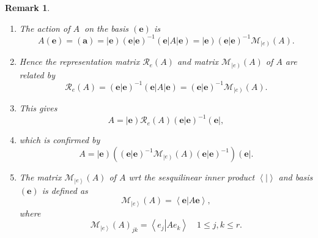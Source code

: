 \documentclass[aps,preprint]{revtex4}%
\newtheorem{remark}[theorem]{Remark}
\begin{document}
\begin{remark}
\begin{enumerate}
\item The action of $A\ $ on the basis $\left(  \mathbf{e}\right)  $ is
\begin{equation}
A\left(  \mathbf{e}\right)  =\left(  \mathbf{a}\right)  =\left\vert
\mathbf{e}\right)  \left(  \left.  \mathbf{e}\right\vert \mathbf{e}\right)
^{-1}\left(  \mathbf{e}\right\vert A\left\vert \mathbf{e}\right)  =\left\vert
\mathbf{e}\right)  \left(  \left.  \mathbf{e}\right\vert \mathbf{e}\right)
^{-1}\mathcal{M}_{\left\vert e\right)  }\left(  A\right)  .
\end{equation}


\item Hence the representation matrix $\mathcal{R}_{e}\left(  A\right)  $ and
matrix $\mathcal{M}_{\left\vert e\right)  }\left(  A\right)  $ of $A$ are
related by
\begin{equation}
\mathcal{R}_{e}\left(  A\right)  =\left(  \left.  \mathbf{e}\right\vert
\mathbf{e}\right)  ^{-1}\left(  \mathbf{e}\right\vert A\left\vert
\mathbf{e}\right)  =\left(  \left.  \mathbf{e}\right\vert \mathbf{e}\right)
^{-1}\mathcal{M}_{\left\vert e\right)  }\left(  A\right)  .
\end{equation}


\item This gives
\begin{equation}
A=\left\vert \mathbf{e}\right)  \mathcal{R}_{e}\left(  A\right)  \left(
\left.  \mathbf{e}\right\vert \mathbf{e}\right)  ^{-1}\left(  \mathbf{e}%
\right\vert ,
\end{equation}


\item which is confirmed by
\begin{equation}
A=\left\vert \mathbf{e}\right)  \left(  \overset{}{\left(  \left.
\mathbf{e}\right\vert \mathbf{e}\right)  ^{-1}\mathcal{M}_{\left\vert
e\right)  }\left(  A\right)  \left(  \left.  \mathbf{e}\right\vert
\mathbf{e}\right)  ^{-1}}\right)  \left(  \mathbf{e}\right\vert .
\end{equation}


\item The matrix $\mathcal{M}_{\left\vert e\right\rangle }\left(  A\right)  $
of $A$ wrt the sesquilinear inner product $\left\langle \left.  {}\right\vert
\right\rangle $ and basis $\left(  \mathbf{e}\right)  $ is defined as
\begin{equation}
\mathcal{M}_{\left\vert e\right\rangle }\left(  A\right)  =\left\langle
\left.  \mathbf{e}\right\vert A\mathbf{e}\right\rangle ,
\end{equation}
where
\begin{equation}
\mathcal{M}_{\left\vert e\right\rangle }\left(  A\right)  _{jk}=\left\langle
\left.  e_{j}\right\vert Ae_{k}\right\rangle \quad1\leq j,k\leq r.
\end{equation}



\end{enumerate}
\end{remark}
\end{document}
